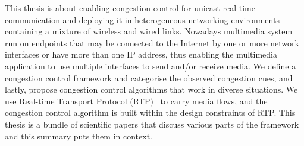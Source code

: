 This thesis is about enabling congestion control for unicast real-time communication and
deploying it in heterogeneous networking environments containing a mixture of
wireless and wired links. Nowadays multimedia system run on endpoints that may
be connected to the Internet by one or more network interfaces or have more 
than one IP address, thus enabling the multimedia application to
use multiple interfaces to send and/or receive media. 
We define a congestion control framework and categorise the observed congestion
cues, and lastly, propose congestion control algorithms that work in diverse
situations. We use Real-time Transport Protocol (RTP)~\cite{rfc3550} to carry
media flows, and the congestion control algorithm is built within the
design constraints of RTP. This thesis is a bundle of scientific papers that 
discuss various parts of the framework and this summary puts them in context.





